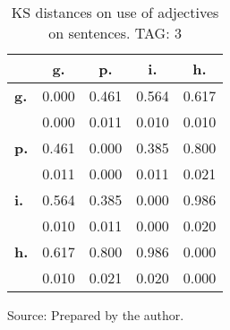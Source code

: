 \begin{table}[h!]
\begin{center}
\caption{KS distances on use of adjectives on sentences. TAG: 3}
\begin{tabular}{| l || c | c | c | c |}\hline
 & {\bf g.} & {\bf p.} & {\bf i.} & {\bf h.} \\\hline\hline
{\bf g.} & 0.000 & 0.461 & 0.564 & 0.617 \\
{\bf } & 0.000 & 0.011 & 0.010 & 0.010 \\\hline
{\bf p.} & 0.461 & 0.000 & 0.385 & 0.800 \\
{\bf } & 0.011 & 0.000 & 0.011 & 0.021 \\\hline
{\bf i.} & 0.564 & 0.385 & 0.000 & 0.986 \\
{\bf } & 0.010 & 0.011 & 0.000 & 0.020 \\\hline
{\bf h.} & 0.617 & 0.800 & 0.986 & 0.000 \\
{\bf } & 0.010 & 0.021 & 0.020 & 0.000 \\\hline
\end{tabular}
\begin{flushleft}
		Source: Prepared by the author.\
\end{flushleft}
\end{center}
\end{table}
